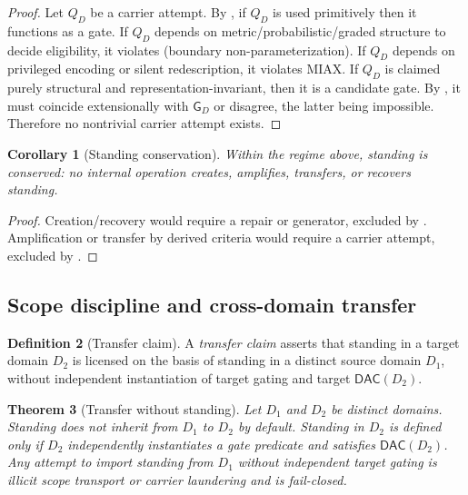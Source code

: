 \documentclass[11pt]{article}
\newtheorem{theorem}{Theorem}[section]
\newtheorem{corollary}[theorem]{Corollary}
\theoremstyle{definition}
\newtheorem{definition}[theorem]{Definition}
\newcommand{\DAC}{\mathsf{DAC}}
\newcommand{\Gate}{\mathsf{G}}
\begin{document}
\begin{proof}
Let $Q_D$ be a carrier attempt.
By , if $Q_D$ is used primitively then it functions as a gate.
If $Q_D$ depends on metric/probabilistic/graded structure to decide eligibility, it violates  (boundary non-parameterization).
If $Q_D$ depends on privileged encoding or silent redescription, it violates MIAX.
If $Q_D$ is claimed purely structural and representation-invariant, then it is a candidate gate.
By , it must coincide extensionally with $\Gate_D$ or disagree, the latter being impossible.
Therefore no nontrivial carrier attempt exists.
\end{proof}

\begin{corollary}[Standing conservation]
\label{cor:conservation}
Within the regime above, standing is conserved: no internal operation creates, amplifies, transfers, or recovers standing.
\end{corollary}

\begin{proof}
Creation/recovery would require a repair or generator, excluded by .
Amplification or transfer by derived criteria would require a carrier attempt, excluded by .
\end{proof}

\subsection{Scope discipline and cross-domain transfer}

\begin{definition}[Transfer claim]
A \emph{transfer claim} asserts that standing in a target domain $D_2$ is licensed on the basis of standing in a distinct source domain $D_1$, without independent instantiation of target gating and target $\DAC(D_2)$.
\end{definition}

\begin{theorem}[Transfer without standing]
\label{thm:transfer}
Let $D_1$ and $D_2$ be distinct domains.
Standing does not inherit from $D_1$ to $D_2$ by default.
Standing in $D_2$ is defined only if $D_2$ independently instantiates a gate predicate and satisfies $\DAC(D_2)$.
Any attempt to import standing from $D_1$ without independent target gating is illicit scope transport or carrier laundering and is fail-closed.
\end{theorem}
\end{document}
